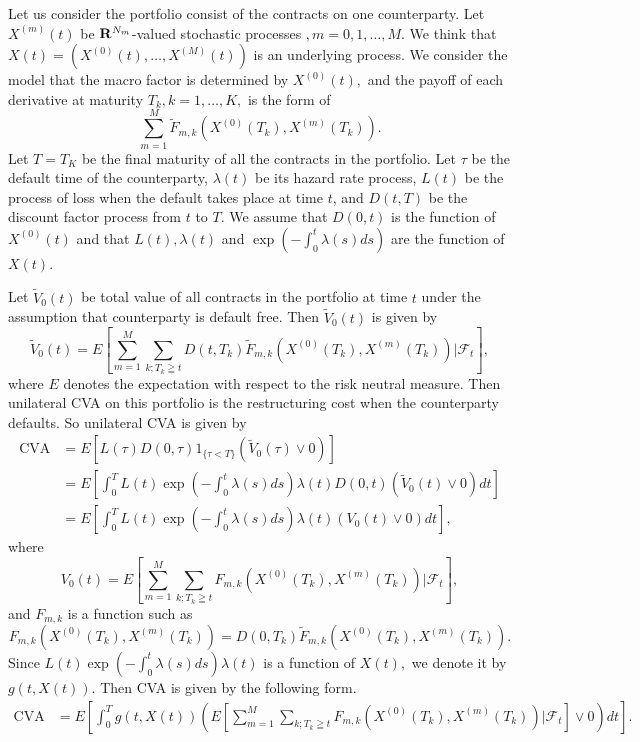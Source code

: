 \documentclass[12pt]{article}
\begin{document}
Let us consider the portfolio consist of the contracts on one counterparty. 
Let $X^{(m)}(t)$ be ${\bf R}^{N_m}$-valued
stochastic processes $, m=0, 1, \ldots, M.$ We think that $X(t)=(X^{(0)}(t),\ldots, X^{(M)}(t))$ is an underlying process. 
We consider the model that the macro factor is determined by $X^{(0)}(t),$ and the payoff of each derivative at maturity $T_k, k=1,\ldots,K,$ is the form of
$$\sum_{m=1}^M \tilde{F}_{m,k}(X^{(0)}(T_k), X^{(m)}(T_k)).$$
Let $T=T_K$ be the final maturity of all the contracts in the portfolio. Let $\tau$ be the default time of the counterparty, $\lambda(t)$ be its 
hazard rate process, $L(t)$ be the process of loss when the default takes place at time $t$, and $D(t,T)$ be the discount factor process from $t$ to $T$.
We assume that $D(0,t)$ is the function of $X^{(0)}(t)$ and that $L(t), \lambda(t)$ and $\exp(-\int_0^t \lambda(s)ds )$ are the function of $X(t).$   

Let $\tilde{V}_0(t)$ be total value of all contracts in the portfolio at time $t$ under the assumption that counterparty is default free. Then $\tilde{V}_0(t)$ is given by 
$$\tilde{V}_0(t) =E[\sum_{m=1}^M \sum_{k; T_k \geqq t}D(t,T_k)\tilde{F}_{m,k}(X^{(0)}(T_k), X^{(m)}(T_k)) | \mathcal{F}_t],$$
where $E$ denotes the expectation with respect to the risk neutral measure.
Then unilateral CVA on this portfolio is the restructuring cost when the counterparty
defaults.
So unilateral CVA is given by
\begin{align}
\text{CVA}&= E[L(\tau)D(0,\tau)1_{\{\tau <T\}}(\tilde{V}_0(\tau)\vee 0)] \nonumber\\
&=E[\int_0^T L(t)\exp(-\int_0^t \lambda(s)ds ) \lambda(t)D(0,t) (\tilde{V}_0(t) \vee 0)  dt ] \nonumber\\
&=E[\int_0^T L(t)\exp(-\int_0^t \lambda(s)ds ) \lambda(t) (V_0(t) \vee 0)  dt ] \label{defCVA},
\end{align}
where
$$V_0(t) =E[\sum_{m=1}^M \sum_{k; T_k \geqq t}F_{m,k}(X^{(0)}(T_k), X^{(m)}(T_k)) | \mathcal{F}_t],$$
and $F_{m,k}$ is a function such as 
$$F_{m,k}(X^{(0)}(T_k), X^{(m)}(T_k))=D(0,T_k)\tilde{F}_{m,k}(X^{(0)}(T_k), X^{(m)}(T_k)).$$
Since $L(t)\exp(-\int_0^t \lambda(s)ds ) \lambda(t)$ is a function of $X(t),$ we denote it by $g(t,X(t)).$ Then CVA is given by the following form. 
\begin{align}
\text{CVA}&=E[\int_0^T g(t,X(t))  (E[\sum_{m=1}^M \sum_{k; T_k \geqq t}F_{m,k}(X^{(0)}(T_k), X^{(m)}(T_k)) | \mathcal{F}_t] \vee 0)  dt ] \label{defCVA2}.
\end{align}
\end{document}

